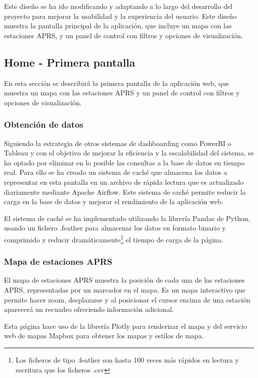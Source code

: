 Este diseño se ha ido modificando y adaptando a lo largo del desarrollo del proyecto para mejorar la usabilidad y la experiencia del usuario. Este diseño muestra la pantalla principal de la aplicación, que incluye un mapa con las estaciones APRS, y un panel de control con filtros y opciones de visualización.

\subsection*{Home - Primera pantalla}
En esta sección se describirá la primera pantalla de la aplicación web, que muestra un mapa con las estaciones APRS y un panel de control con filtros y opciones de visualización.

\subsubsection*{Obtención de datos}

Siguiendo la estrategia de otros sistemas de dashboarding como PowerBI o Tableau y con el objetivo de mejorar la eficiencia y la escalabilidad del sistema, se ha optado por eliminar en lo posible las consultas a la base de datos en tiempo real. Para ello se ha creado un sistema de caché que almacena los datos a representar en esta pantalla en un archivo de rápida lectura que es actualizado diariamente mediante Apache Airflow. Este sistema de caché permite reducir la carga en la base de datos y mejorar el rendimiento de la aplicación web.

El sistema de caché se ha implementado utilizando la librería Pandas de Python, usando un fichero .feather para almacenar los datos en formato binario y comprimido y reducir dramáticamente\footnote{Los ficheros de tipo .feather son hasta 100 veces más rápidos en lectura y escritura que los ficheros .csv} el tiempo de carga de la página.

\subsubsection*{Mapa de estaciones APRS}

El mapa de estaciones APRS muestra la posición de cada una de las estaciones APRS, representadas por un marcador en el mapa. Es un mapa interactivo que permite hacer zoom, desplazarse y al posicionar el cursor encima de una estación aparecerá un recuadro ofreciendo información adicional.

Esta página hace uso de la librería Plotly para renderizar el mapa y del servicio web de mapas Mapbox para obtener los mapas y estilos de mapa.

